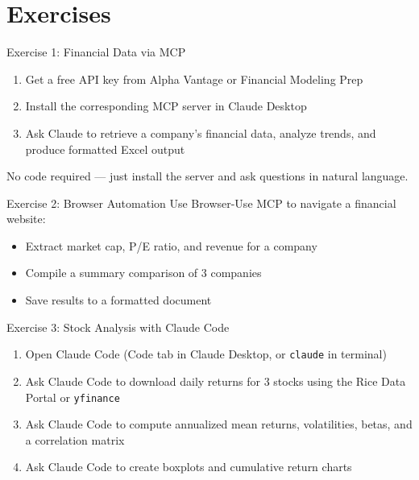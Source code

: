\documentclass[aspectratio=169]{beamer}
\begin{document}
\section{Exercises}

\begin{frame}{Exercise 1: Financial Data via MCP}
\begin{enumerate}
  \item Get a free API key from Alpha Vantage or Financial Modeling Prep
  \item Install the corresponding MCP server in Claude Desktop
  \item Ask Claude to retrieve a company's financial data, analyze trends, and produce formatted Excel output
\end{enumerate}
\vspace{0.3cm}
\alert{No code required} --- just install the server and ask questions in natural language.
\end{frame}

\begin{frame}{Exercise 2: Browser Automation}
Use Browser-Use MCP to navigate a financial website:
\begin{itemize}
  \item Extract market cap, P/E ratio, and revenue for a company
  \item Compile a summary comparison of 3 companies
  \item Save results to a formatted document
\end{itemize}
\end{frame}

\begin{frame}{Exercise 3: Stock Analysis with Claude Code}
\begin{enumerate}
  \item Open Claude Code (Code tab in Claude Desktop, or \texttt{claude} in terminal)
  \item Ask Claude Code to download daily returns for 3 stocks using the Rice Data Portal or \texttt{yfinance}
  \item Ask Claude Code to compute annualized mean returns, volatilities, betas, and a correlation matrix
  \item Ask Claude Code to create boxplots and cumulative return charts
\end{enumerate}
\end{frame}
\end{document}
